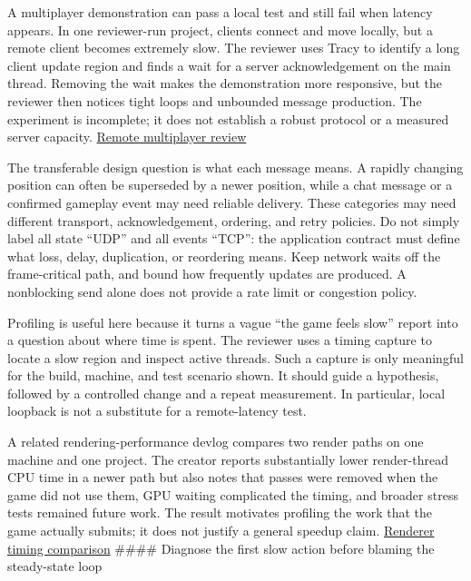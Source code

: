 \hypertarget{06-engine-ii-ch026-measure-the-actual-path-then-keep-time-and-network-work-bounded}{}

A multiplayer demonstration can pass a local test and still fail when latency appears. In one reviewer-run project, clients connect and move locally, but a remote client becomes extremely slow. The reviewer uses Tracy to identify a long client update region and finds a wait for a server acknowledgement on the main thread. Removing the wait makes the demonstration more responsive, but the reviewer then notices tight loops and unbounded message production. The experiment is incomplete; it does not establish a robust protocol or a measured server capacity. \href{https://www.youtube.com/watch?v=lAXOmE481j4&t=17m3s}{Remote multiplayer review}

The transferable design question is what each message means. A rapidly changing position can often be superseded by a newer position, while a chat message or a confirmed gameplay event may need reliable delivery. These categories may need different transport, acknowledgement, ordering, and retry policies. Do not simply label all state ``UDP'' and all events ``TCP'': the application contract must define what loss, delay, duplication, or reordering means. Keep network waits off the frame-critical path, and bound how frequently updates are produced. A nonblocking send alone does not provide a rate limit or congestion policy.

Profiling is useful here because it turns a vague ``the game feels slow'' report into a question about where time is spent. The reviewer uses a timing capture to locate a slow region and inspect active threads. Such a capture is only meaningful for the build, machine, and test scenario shown. It should guide a hypothesis, followed by a controlled change and a repeat measurement. In particular, local loopback is not a substitute for a remote-latency test.

A related rendering-performance devlog compares two render paths on one machine and one project. The creator reports substantially lower render-thread CPU time in a newer path but also notes that passes were removed when the game did not use them, GPU waiting complicated the timing, and broader stress tests remained future work. The result motivates profiling the work that the game actually submits; it does not justify a general speedup claim. \href{https://www.youtube.com/watch?v=ddfMzq0CNTw&t=11m16s}{Renderer timing comparison} \#\#\#\# Diagnose the first slow action before blaming the steady-state loop

